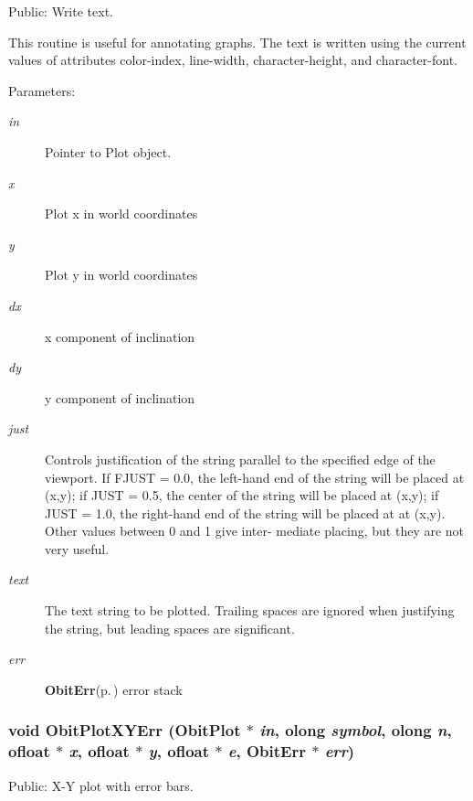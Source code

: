 Public: Write text. 

This routine is useful for annotating graphs. The text is written using the current values of attributes color-index, line-width, character-height, and character-font. \begin{Desc}
\item[Parameters:]
\begin{description}
\item[{\em in}]Pointer to Plot object. \item[{\em x}]Plot x in world coordinates \item[{\em y}]Plot y in world coordinates \item[{\em dx}]x component of inclination \item[{\em dy}]y component of inclination \item[{\em just}]Controls justification of the string parallel to the specified edge of the viewport. If FJUST = 0.0, the left-hand end of the string will be placed at (x,y); if JUST = 0.5, the center of the string will be placed at (x,y); if JUST = 1.0, the right-hand end of the string will be placed at at (x,y). Other values between 0 and 1 give inter- mediate placing, but they are not very useful. \item[{\em text}]The text string to be plotted. Trailing spaces are ignored when justifying the string, but leading spaces are significant. \item[{\em err}]{\bf Obit\-Err}{\rm (p.\,\pageref{structObitErr})} error stack \end{description}
\end{Desc}
\subsubsection{\setlength{\rightskip}{0pt plus 5cm}void Obit\-Plot\-XYErr ({\bf Obit\-Plot} $\ast$ {\em in}, {\bf olong} {\em symbol}, {\bf olong} {\em n}, {\bf ofloat} $\ast$ {\em x}, {\bf ofloat} $\ast$ {\em y}, {\bf ofloat} $\ast$ {\em e}, {\bf Obit\-Err} $\ast$ {\em err})}\label{ObitPlot_8c_a14}


Public: X-Y plot with error bars. 


